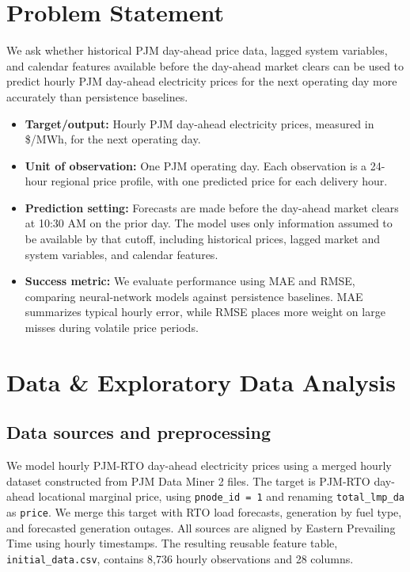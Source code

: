 \documentclass{article}
\begin{document}
\section{Problem Statement}

We ask whether historical PJM day-ahead price data, lagged system variables, and calendar features available before the day-ahead market clears can be used to predict hourly PJM day-ahead electricity prices for the next operating day more accurately than persistence baselines.

\begin{itemize}
  \item \textbf{Target/output:} Hourly PJM day-ahead electricity prices, measured in \$/MWh, for the next operating day.
  
  \item \textbf{Unit of observation:} One PJM operating day. Each observation is a 24-hour regional price profile, with one predicted price for each delivery hour.
  
  \item \textbf{Prediction setting:} Forecasts are made before the day-ahead market clears at 10:30 AM on the prior day. The model uses only information assumed to be available by that cutoff, including historical prices, lagged market and system variables, and calendar features.
  
  \item \textbf{Success metric:} We evaluate performance using MAE and RMSE, comparing neural-network models against persistence baselines. MAE summarizes typical hourly error, while RMSE places more weight on large misses during volatile price periods.
\end{itemize}

\section{Data \& Exploratory Data Analysis}

\subsection{Data sources and preprocessing}

We model hourly PJM-RTO day-ahead electricity prices using a merged hourly dataset constructed from PJM Data Miner 2 files. The target is PJM-RTO day-ahead locational marginal price, using \texttt{pnode\_id = 1} and renaming \texttt{total\_lmp\_da} as \texttt{price}. We merge this target with RTO load forecasts, generation by fuel type, and forecasted generation outages. All sources are aligned by Eastern Prevailing Time using hourly timestamps. The resulting reusable feature table, \texttt{initial\_data.csv}, contains 8,736 hourly observations and 28 columns.
\end{document}
